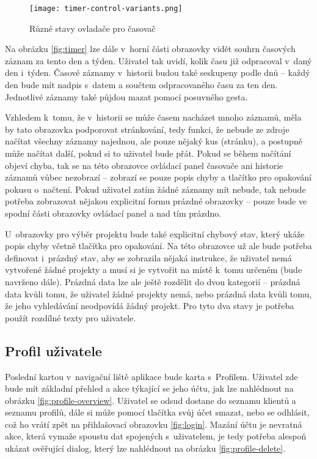 \begin{figure}[h]
	\centering
	\texttt{[image: timer-control-variants.png]}
	\caption{Různé stavy ovladače pro časovač}
	\label{fig:timer-control-variants}
\end{figure}

Na obrázku \ref{fig:timer} lze dále v~horní části obrazovky vidět souhrn časových záznam za tento den a týden. Uživatel tak uvidí, kolik času již odpracoval v~daný den i~týden. Časové záznamy v~historii budou také seskupeny podle dnů – každý den bude mít nadpis s~datem a součtem odpracovaného času za ten den. Jednotlivé záznamy také půjdou mazat pomocí posuvného gesta.

Vzhledem k~tomu, že v~historii se může časem nacházet mnoho záznamů, měla by tato obrazovka podporovat stránkování, tedy funkci, že nebude ze zdroje načítat všechny záznamy najednou, ale pouze nějaký kus (stránku), a postupně může načítat další, pokud si to uživatel bude přát. Pokud se během načítání objeví chyba, tak se na této obrazovce ovládací panel časovače ani historie záznamů vůbec nezobrazí – zobrazí se pouze popis chyby a tlačítko pro opakování pokusu o~načtení. Pokud uživatel zatím žádné záznamy mít nebude, tak nebude potřeba zobrazovat nějakou explicitní formu prázdné obrazovky – pouze bude ve spodní části obrazovky ovládací panel a nad tím prázdno.

U~obrazovky pro výběr projektu bude také explicitní chybový stav, který ukáže popis chyby včetně tlačítka pro opakování. Na této obrazovce už ale bude potřeba definovat i~prázdný stav, aby se zobrazila nějaká instrukce, že uživatel nemá vytvořené žádné projekty a musí si je vytvořit na místě k~tomu určeném (bude navrženo dále). Prázdná data lze ale ještě rozdělit do dvou kategorií – prázdná data kvůli tomu, že uživatel žádné projekty nemá, nebo prázdná data kvůli tomu, že jeho vyhledávání neodpovídá žádný projekt. Pro tyto dva stavy je potřeba použít rozdílné texty pro uživatele.

\subsection{Profil uživatele}

Poslední kartou v~navigační liště aplikace bude karta s~Profilem. Uživatel zde bude mít základní přehled a akce týkající se jeho účtu, jak lze nahlédnout na obrázku \ref{fig:profile-overview}. Uživatel se odsud dostane do seznamu klientů a seznamu profilů, dále si může pomocí tlačítka svůj účet smazat, nebo se odhlásit, což ho vrátí zpět na přihlašovací obrazovku \ref{fig:login}. Mazání účtu je nevratná akce, která vymaže spoustu dat spojených s~uživatelem, je tedy potřeba alespoň ukázat ověřující dialog, který lze nahlédnout na obrázku \ref{fig:profile-delete}. 

